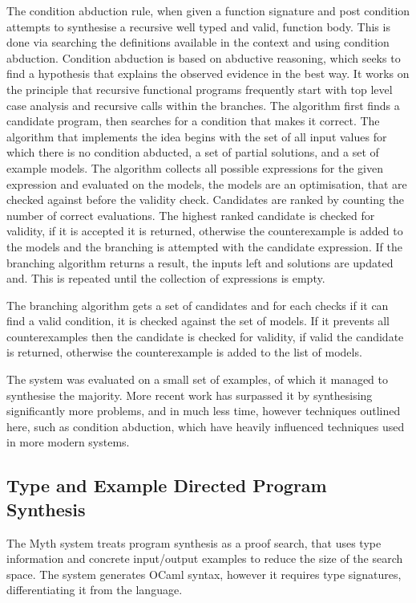 \documentclass[a4paper]{article}
\begin{document}
The condition abduction rule, when given a function signature and post condition attempts to synthesise a recursive 
well typed and valid, function body. This is done via searching the definitions available in the context and using 
condition abduction. Condition abduction is based on abductive reasoning, which seeks to find a hypothesis that explains the 
observed evidence in the best way. It works on the principle that recursive functional programs frequently start with top 
level case analysis and recursive calls within the branches. The algorithm first finds a candidate program, then searches
for a condition that makes it correct. The algorithm that implements the idea begins with the set of all input values 
for which there is no condition abducted, a set of partial solutions, and a set of example models. The algorithm collects 
all possible expressions for the given expression and evaluated on the models, the models are an optimisation, that are 
checked against before the validity check. Candidates are ranked by counting the number of correct evaluations. The highest ranked candidate is checked 
for validity, if it is accepted it is returned, otherwise the counterexample is added to the models and the branching is 
attempted with the candidate expression. If the branching algorithm returns a result, the inputs left and solutions are
updated and. This is repeated until the collection of expressions is empty. 

The branching algorithm gets a set of candidates and for each checks if it can find a valid condition, it is checked 
against the set of models. If it prevents all counterexamples then the candidate is checked for validity, if valid the 
candidate is returned, otherwise the counterexample is added to the list of models. 

The system was evaluated on a small set of examples, of which it managed to synthesise the majority. More recent work 
has surpassed it by synthesising significantly more problems, and in much less time, however techniques outlined here, 
such as condition abduction, which have heavily influenced techniques used in more modern systems.

\subsection{Type and Example Directed Program Synthesis}
\label{sec:org97dc857}
The Myth system treats program synthesis as a proof search, that uses
type information and concrete input/output examples to reduce the size
of the search space. The system generates OCaml syntax, however it 
requires type signatures, differentiating it from the language.
\end{document}
